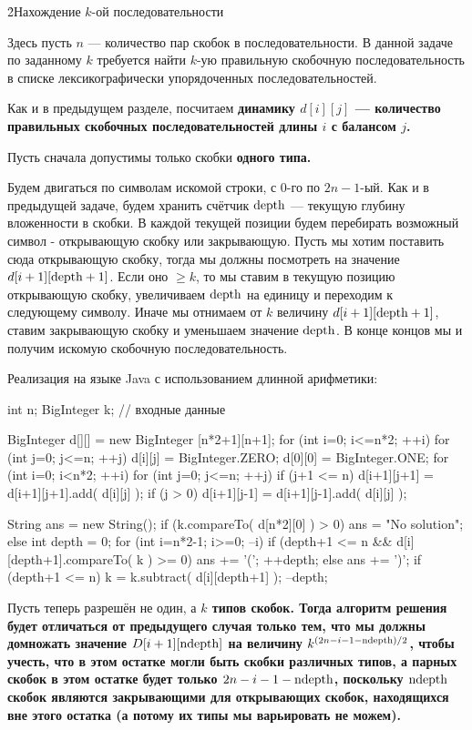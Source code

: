 \h2{Нахождение $k$-ой последовательности}

Здесь пусть $n$ --- количество пар скобок в последовательности. В данной задаче по заданному $k$ требуется найти $k$-ую правильную скобочную последовательность в списке лексикографически упорядоченных последовательностей.

Как и в предыдущем разделе, посчитаем \bf{динамику} $d[i][j]$ --- количество правильных скобочных последовательностей длины $i$ с балансом $j$.

Пусть сначала допустимы только скобки \bf{одного} типа.

Будем двигаться по символам искомой строки, с $0$-го по $2n-1$-ый. Как и в предыдущей задаче, будем хранить счётчик $\rm depth$ --- текущую глубину вложенности в скобки. В каждой текущей позиции будем перебирать возможный символ - открывающую скобку или закрывающую. Пусть мы хотим поставить сюда открывающую скобку, тогда мы должны посмотреть на значение $d[i+1][\rm depth+1]$. Если оно $\ge k$, то мы ставим в текущую позицию открывающую скобку, увеличиваем $\rm depth$ на единицу и переходим к следующему символу. Иначе мы отнимаем от $k$ величину $d[i+1][\rm depth+1]$, ставим закрывающую скобку и уменьшаем значение $\rm depth$. В конце концов мы и получим искомую скобочную последовательность.

Реализация на языке Java с использованием длинной арифметики:

\code
int n;  BigInteger k;  // входные данные

BigInteger d[][] = new BigInteger [n*2+1][n+1];
for (int i=0; i<=n*2; ++i)
	for (int j=0; j<=n; ++j)
		d[i][j] = BigInteger.ZERO;
d[0][0] = BigInteger.ONE;
for (int i=0; i<n*2; ++i)
	for (int j=0; j<=n; ++j) {
		if (j+1 <= n)
			d[i+1][j+1] = d[i+1][j+1].add( d[i][j] );
		if (j > 0)
			d[i+1][j-1] = d[i+1][j-1].add( d[i][j] );
	}

String ans = new String();
if (k.compareTo( d[n*2][0] ) > 0)
	ans = "No solution";
else {
	int depth = 0;
	for (int i=n*2-1; i>=0; --i)
		if (depth+1 <= n && d[i][depth+1].compareTo( k ) >= 0) {
			ans += '(';
			++depth;
		}
		else {
			ans += ')';
			if (depth+1 <= n)
				k = k.subtract( d[i][depth+1] );
			--depth;
		}
}
\endcode

Пусть теперь разрешён не один, а \bf{$k$ типов} скобок. Тогда алгоритм решения будет отличаться от предыдущего случая только тем, что мы должны домножать значение $D[i+1][\rm ndepth]$ на величину $k^{(2n-i-1- \rm ndepth)/2}$, чтобы учесть, что в этом остатке могли быть скобки различных типов, а парных скобок в этом остатке будет только $2n-i-1- \rm ndepth$, поскольку $\rm ndepth$ скобок являются закрывающими для открывающих скобок, находящихся вне этого остатка (а потому их типы мы варьировать не можем).

